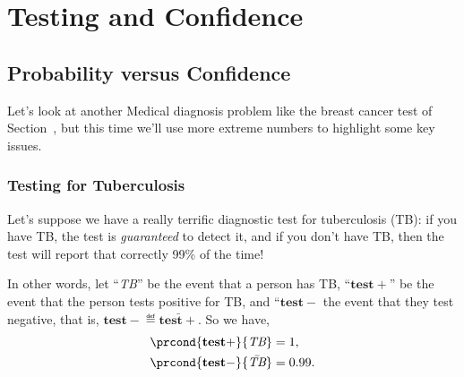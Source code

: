\chapter{Testing and Confidence}\label{sec: Confidence_v_Prob}

\section{Probability versus Confidence}

\newcommand{\BF}[2]{\operatorname{Bayes-factor}(#1,#2)}
\newcommand{\testplus}{\ensuremath{\mathbf{test+}}}
\newcommand{\testminus}{\ensuremath{\mathbf{test-}}}
\newcommand{\TB}{\emph{TB}}

Let's look at another Medical diagnosis problem like the breast cancer
test of Section~, but this time we'll use
more extreme numbers to highlight some key issues.

\subsection{Testing for Tuberculosis}

Let's suppose we have a really terrific diagnostic test for
tuberculosis (TB): if you have TB, the test is \emph{guaranteed} to
detect it, and if you don't have TB, then the test will report that
correctly 99\% of the time!

In other words, let ``\TB'' be the event that a person
has TB, ``\testplus'' be the event that the person tests
positive for TB, and ``$\testminus$ the event that they test negative,
that is, $\testminus \eqdef \bar{\testplus}$.  So we have,
\begin{align}
\prcond{\testplus}{\TB} & = 1,\label{pr+TB}\\
\prcond{\testminus}{\bar{\TB}} & = 0.99.\label{pr-barTB}
\end{align}

